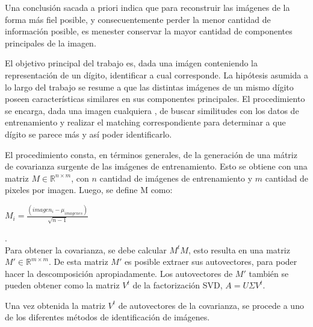 Una conclusi\'on sacada a priori indica que para reconstruir las im\'agenes de la forma m\'as fiel posible,
y consecuentemente perder la menor cantidad de informaci\'on posible, es menester conservar la mayor cantidad
de componentes principales de la imagen.

El objetivo principal del trabajo es, dada una im\'agen conteniendo la representaci\'on de un d\'igito,
identificar a cual corresponde. La hip\'otesis asumida a lo largo del trabajo se
resume a que las distintas im\'agenes de un mismo d\'igito poseen caracter\'isticas 
similares en sus componentes principales. El procedimiento se encarga, dada una imagen cualquiera
, de buscar similitudes con los datos de entrenamiento y realizar el matching correspondiente
para determinar a que d\'igito se parece m\'as y as\'i poder identificarlo.

El procedimiento consta, en t\'erminos generales, de la generaci\'on de una 
m\'atriz de covarianza surgente de las im\'agenes de entrenamiento. 
Esto se obtiene con una matriz $M \in \mathbb{R}^{n \times m}$, con $n$ cantidad
de im\'agenes de entrenamiento y $m$ cantidad de pixeles por imagen. Luego, se define M como:
\\

\centerline{$M_i = \frac{(imagen_i - \mu_{imagenes})}{\sqrt{n-1}}$}.
\\

Para obtener la covarianza, se debe calcular $M^t M$, esto resulta en una matriz $M' \in \mathbb{R}^{m \times m}$.
De esta matriz $M'$ es posible extraer sus autovectores, para poder hacer la descomposici\'on apropiadamente.
Los autovectores de $M'$ tambi\'en se pueden obtener como la matriz $V^t$ de la factorizaci\'on SVD, $A=U\Sigma V^t$.

Una vez obtenida la matriz $V^t$ de autovectores de la covarianza, se procede a uno de los diferentes m\'etodos de
identificaci\'on de im\'agenes.
